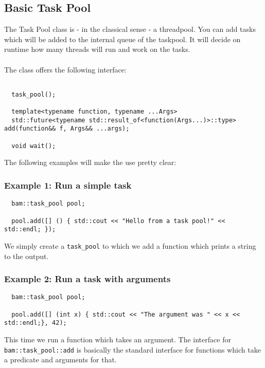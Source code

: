 \documentclass[11pt, a4paper]{article}
\begin{document}
\subsection{ Basic Task Pool}

The Task Pool class is - in the classical sense - a threadpool. You can add tasks which will be added to the internal queue of the taskpool. It will decide on runtime how many threads will run and work on the tasks. \\\\
The class offers the following interface:\\

\begin{lstlisting}

  task_pool();

  template<typename function, typename ...Args>
  std::future<typename std::result_of<function(Args...)>::type> add(function&& f, Args&& ...args);

  void wait();

\end{lstlisting}

The following examples will make the use pretty clear:

\subsubsection{Example 1: Run a simple task}

\begin{lstlisting}
  bam::task_pool pool;

  pool.add([] () { std::cout << "Hello from a task pool!" << std::endl; });

\end{lstlisting}

We simply create a \texttt{task\_pool} to which we add a function which prints a string to the output. 

\subsubsection{Example 2: Run a task with arguments}
\begin{lstlisting}
  bam::task_pool pool;

  pool.add([] (int x) { std::cout << "The argument was " << x << std::endl;}, 42);
\end{lstlisting}
This time we run a function which takes an argument. The interface for \texttt{bam::task\_pool::add} is basically the standard interface for functions which take a predicate and arguments for that. 
\end{document}
